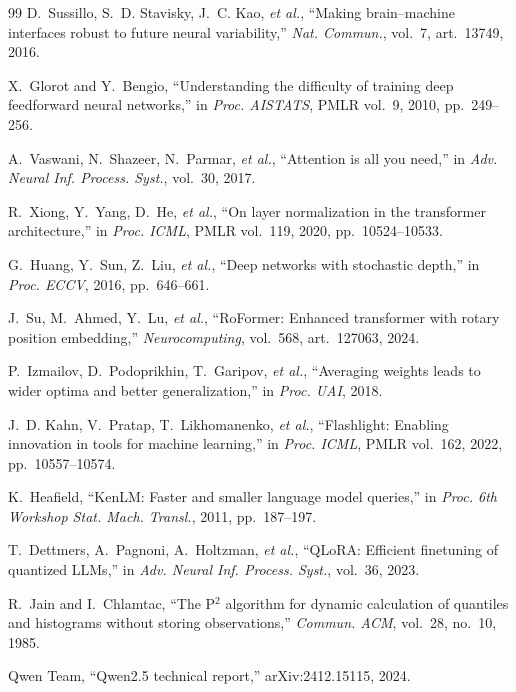 \documentclass[conference,a4paper,10pt]{IEEEtran}
\begin{document}
\begin{thebibliography}{99}
D.~Sussillo, S.~D. Stavisky, J.~C. Kao, \textit{et al.}, ``Making brain--machine interfaces robust to future neural variability,'' \textit{Nat. Commun.}, vol.~7, art.~13749, 2016.

X.~Glorot and Y.~Bengio, ``Understanding the difficulty of training deep feedforward neural networks,'' in \textit{Proc. AISTATS}, PMLR vol.~9, 2010, pp.~249--256.

A.~Vaswani, N.~Shazeer, N.~Parmar, \textit{et al.}, ``Attention is all you need,'' in \textit{Adv. Neural Inf. Process. Syst.}, vol.~30, 2017.

R.~Xiong, Y.~Yang, D.~He, \textit{et al.}, ``On layer normalization in the transformer architecture,'' in \textit{Proc. ICML}, PMLR vol.~119, 2020, pp.~10524--10533.

G.~Huang, Y.~Sun, Z.~Liu, \textit{et al.}, ``Deep networks with stochastic depth,'' in \textit{Proc. ECCV}, 2016, pp.~646--661.

J.~Su, M.~Ahmed, Y.~Lu, \textit{et al.}, ``RoFormer: Enhanced transformer with rotary position embedding,'' \textit{Neurocomputing}, vol.~568, art.~127063, 2024.

P.~Izmailov, D.~Podoprikhin, T.~Garipov, \textit{et al.}, ``Averaging weights leads to wider optima and better generalization,'' in \textit{Proc. UAI}, 2018.

J.~D. Kahn, V.~Pratap, T.~Likhomanenko, \textit{et al.}, ``Flashlight: Enabling innovation in tools for machine learning,'' in \textit{Proc. ICML}, PMLR vol.~162, 2022, pp.~10557--10574.

K.~Heafield, ``KenLM: Faster and smaller language model queries,'' in \textit{Proc. 6th Workshop Stat. Mach. Transl.}, 2011, pp.~187--197.

T.~Dettmers, A.~Pagnoni, A.~Holtzman, \textit{et al.}, ``QLoRA: Efficient finetuning of quantized LLMs,'' in \textit{Adv. Neural Inf. Process. Syst.}, vol.~36, 2023.

R.~Jain and I.~Chlamtac, ``The P$^2$ algorithm for dynamic calculation of quantiles and histograms without storing observations,'' \textit{Commun. ACM}, vol.~28, no.~10, 1985.

Qwen Team, ``Qwen2.5 technical report,'' arXiv:2412.15115, 2024.


\end{thebibliography}
\end{document}
